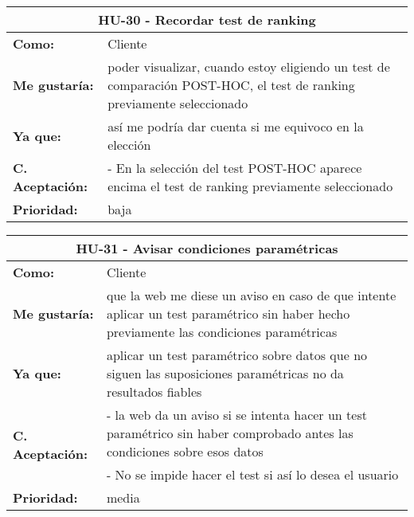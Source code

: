 
\begin{table}[H]
	\begin{tabular}{| p{3cm}| p{12cm} |}
		\hline
		\multicolumn{2}{|c|}{\textbf{HU-30} - Recordar test de ranking} \\ \hline
		\textbf{Como:} & Cliente \\ \hline
		\textbf{Me gustaría:} & poder visualizar, cuando estoy eligiendo un test de comparación POST-HOC, el test de ranking previamente seleccionado \\ \hline
		\textbf{Ya que:} & así me podría dar cuenta si me equivoco en la elección \\ \hline
		\textbf{C. Aceptación:} & - En la selección del test POST-HOC aparece encima el test de ranking previamente seleccionado \\ \hline
		\textbf{\textbf{Prioridad:}} & baja \\ \hline
	\end{tabular}
\end{table}


\begin{table}[H]
	\begin{tabular}{| p{3cm}| p{12cm} |}
		\hline
		\multicolumn{2}{|c|}{\textbf{HU-31} - Avisar condiciones paramétricas} \\ \hline
		\textbf{Como:} & Cliente \\ \hline
		\textbf{Me gustaría:} & que la web me diese un aviso en caso de que intente aplicar un test paramétrico sin haber hecho previamente las condiciones paramétricas \\ \hline
		\textbf{Ya que:} & aplicar un test paramétrico sobre datos que no siguen las suposiciones paramétricas no da resultados fiables \\ \hline
		\multirow{2}{12cm}{\textbf{C. Aceptación:}} & - la web da un aviso si se intenta hacer un test paramétrico sin haber comprobado antes las condiciones sobre esos datos \\
		& - No se impide hacer el test si así lo desea el usuario \\ \hline
		\textbf{\textbf{Prioridad:}} & media \\ \hline
	\end{tabular}
\end{table}



